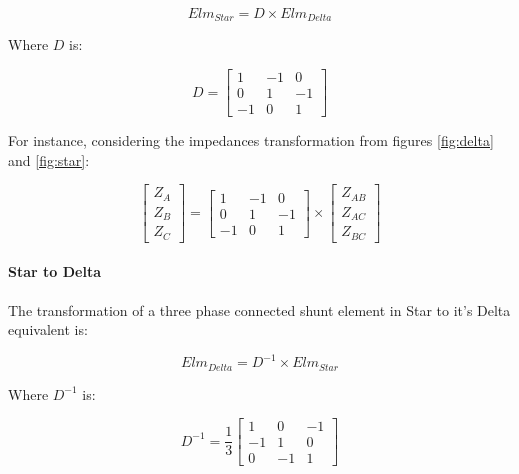 \documentclass{tufte-book}
\begin{document}
\begin{equation}
Elm_{Star} = D \times Elm_{Delta}
\end{equation}

Where $D$ is:

\begin{equation}
D = \left[ \begin{array}{ccc}
1 & -1 & 0 \\
0 & 1 & -1 \\
-1 & 0 & 1
\end{array} \right]
\end{equation}

For instance, considering the impedances transformation from figures \ref{fig:delta} and \ref{fig:star}:

\begin{equation}
\left[ \begin{array}{c}
Z_A \\
Z_B \\
Z_C
\end{array} \right] = \left[ \begin{array}{ccc}
1 & -1 & 0 \\
0 & 1 & -1 \\
-1 & 0 & 1
\end{array} \right] \times \left[ \begin{array}{c}
Z_{AB} \\
Z_{AC} \\
Z_{BC}
\end{array} \right]
\end{equation}

\paragraph{Star to Delta} The transformation of a three phase connected shunt element in Star to it's Delta equivalent is:

\begin{equation}
Elm_{Delta} = D^{-1} \times Elm_{Star}
\end{equation}

Where $D^{-1}$ is:

\begin{equation}
D^{-1} = \frac{1}{3} \left[ \begin{array}{ccc}
1 & 0 & -1 \\
-1 & 1 & 0 \\
0 & -1 & 1
\end{array} \right]
\end{equation}
\end{document}
